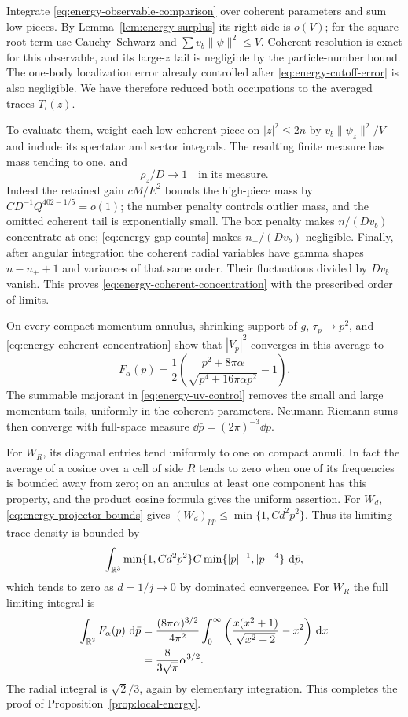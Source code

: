 Integrate \eqref{eq:energy-observable-comparison} over coherent
parameters and sum low pieces.  By Lemma~\ref{lem:energy-surplus} its
right side is $o(V)$; for the square-root term use Cauchy--Schwarz and
$\sum v_b\|\psi\|^2\le V$.  Coherent resolution is exact for this
observable, and its large-$z$ tail is negligible by the particle-number
bound.  The one-body localization error already controlled after
\eqref{eq:energy-cutoff-error} is also negligible.  We have therefore
reduced both occupations to the averaged traces $T_l(z)$.

To evaluate them, weight each low coherent piece on $|z|^2\le2n$ by
$v_b\|\psi_z\|^2/V$ and include its spectator and sector integrals.
The resulting finite measure has mass tending to one, and
\begin{equation}\label{eq:energy-coherent-concentration}
                         \rho_z/D\longrightarrow1
             \quad\text{in its measure}.
\end{equation}
Indeed the retained gain $cM/E^2$ bounds the high-piece mass by
$CD^{-1}Q^{402-1/5}=o(1)$; the number penalty controls outlier mass,
and the omitted coherent tail is exponentially small.  The box penalty makes
$n/(Dv_b)$ concentrate at one; \eqref{eq:energy-gap-counts} makes
$n_+/(Dv_b)$ negligible.  Finally, after angular integration the
coherent radial variables have gamma shapes $n-n_++1$ and variances
of that same order.  Their fluctuations divided by $Dv_b$ vanish.
This proves \eqref{eq:energy-coherent-concentration} with the prescribed
order of limits.

On every compact momentum annulus, shrinking support of $g$,
$\tau_p\to p^2$, and \eqref{eq:energy-coherent-concentration} show that
$|V_p|^2$ converges in this average to
\[
 F_\alpha(p)=\frac12\left(
       \frac{p^2+8\pi\alpha}{\sqrt{p^4+16\pi\alpha p^2}}-1\right).
\]
The summable majorant in \eqref{eq:energy-uv-control} removes the small
and large momentum tails, uniformly in the coherent parameters.
Neumann Riemann sums then converge with full-space measure
$\dd\bar p=(2\pi)^{-3}\dd p$.

For $W_R$, its diagonal entries tend uniformly to one on compact
annuli.  In fact the average of a cosine over a cell of side $R$ tends
to zero when one of its frequencies is bounded away from zero; on an
annulus at least one component has this property, and the product
cosine formula gives the uniform assertion.  For $W_d$,
\eqref{eq:energy-projector-bounds} gives
$(W_d)_{pp}\le\min\{1,Cd^2p^2\}$.  Thus its limiting trace density is
bounded by
\[
 \int_{\mathbb R^3}\min\{1,Cd^2p^2\}
               C\min\{|p|^{-1},|p|^{-4}\}\,\,\mathrm d\bar p,
\]
which tends to zero as $d=1/j\to0$ by dominated convergence.
For $W_R$ the full limiting integral is
\begin{align*}
 \int_{\mathbb R^3}F_\alpha(p)\,\,\mathrm d\bar p
 &=\frac{(8\pi\alpha)^{3/2}}{4\pi^2}
   \int_0^\infty\left(
          \frac{x(x^2+1)}{\sqrt{x^2+2}}-x^2\right)\,\mathrm d x\\
 &=\frac8{3\sqrt\pi}\alpha^{3/2}.
\end{align*}
The radial integral is $\sqrt2/3$, again by elementary integration.
This completes the proof of Proposition~\ref{prop:local-energy}.
